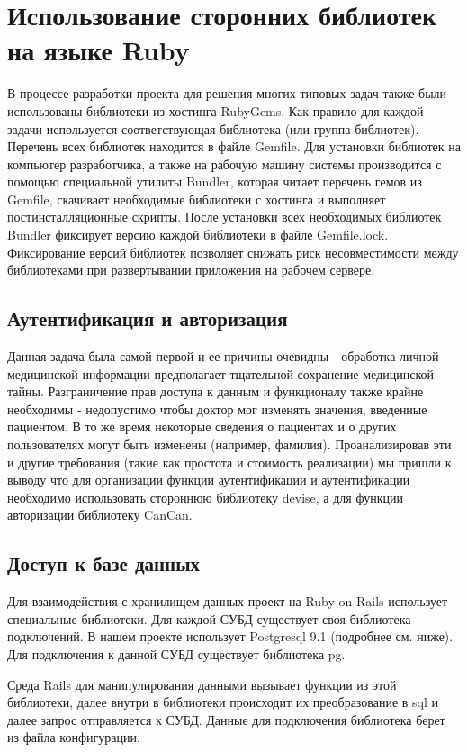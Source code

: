 \section{Использование сторонних библиотек на языке Ruby}
В процессе разработки проекта для решения многих типовых задач также были
использованы библиотеки из хостинга RubyGems. Как правило для каждой задачи
используется соответствующая библиотека (или группа библиотек). Перечень всех
библиотек находится в файле Gemfile. Для установки библиотек на компьютер
разработчика, а также на рабочую машину системы производится с помощью
специальной утилиты Bundler, которая читает перечень гемов из Gemfile, скачивает
необходимые библиотеки с хостинга и выполняет постинсталляционные скрипты. После
установки всех необходимых библиотек Bundler фиксирует версию каждой библиотеки
в файле Gemfile.lock. Фиксирование версий библиотек позволяет снижать риск
несовместимости между библиотеками при развертывании приложения на рабочем
сервере.

\subsection{Аутентификация и авторизация}
Данная задача была самой первой и ее причины очевидны - обработка личной
медицинской информации предполагает тщательной сохранение медицинской тайны.
Разграничение прав доступа к данным и функционалу также крайне необходимы -
недопустимо чтобы доктор мог изменять значения, введенные пациентом. В то же
время некоторые сведения о пациентах и о других пользователях могут быть
изменены (например, фамилия).
Проанализировав эти и другие требования (такие как простота и стоимость
реализации) мы пришли к выводу что для организации функции аутентификации и
аутентификации необходимо использовать стороннюю библиотеку devise, а для
функции авторизации библиотеку CanCan.

\subsection{Доступ к базе данных}
Для взаимодействия с хранилищем данных проект на Ruby on Rails использует
специальные библиотеки. Для каждой СУБД существует своя библиотека подключений.
В нашем проекте использует Postgresql 9.1 (подробнее см. ниже). Для подключения
к данной СУБД существует библиотека pg.
    
Среда Rails для манипулирования данными вызывает функции из этой библиотеки,
далее внутри в библиотеки происходит их преобразование в sql и далее запрос
отправляется к СУБД. Данные для подключения библиотека берет из файла
конфигурации.


